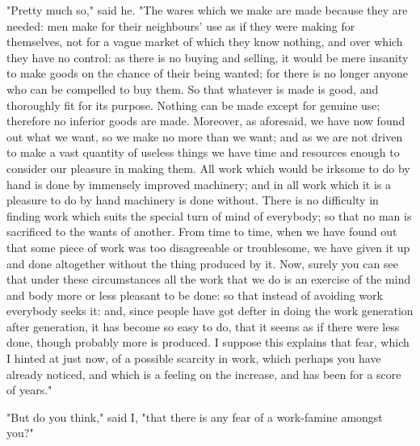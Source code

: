 "Pretty much so," said he. "The wares which we make are made because
they are needed: men make for their neighbours' use as if they were
making for themselves, not for a vague market of which they know
nothing, and over which they have no control: as there is no buying and
selling, it would be mere insanity to make goods on the chance of their
being wanted; for there is no longer anyone who can be compelled to buy
them. So that whatever is made is good, and thoroughly fit for its
purpose. Nothing can be made except for genuine use; therefore no
inferior goods are made. Moreover, as aforesaid, we have now found out
what we want, so we make no more than we want; and as we are not driven
to make a vast quantity of useless things we have time and resources
enough to consider our pleasure in making them. All work which would be
irksome to do by hand is done by immensely improved machinery; and in
all work which it is a pleasure to do by hand machinery is done without.
There is no difficulty in finding work which suits the special turn of
mind of everybody; so that no man is sacrificed to the wants of another.
From time to time, when we have found out that some piece of work was
too disagreeable or troublesome, we have given it up and done altogether
without the thing produced by it. Now, surely you can see that under
these circumstances all the work that we do is an exercise of the mind
and body more or less pleasant to be done: so that instead of avoiding
work everybody seeks it: and, since people have got defter in doing the
work generation after generation, it has become so easy to do, that it
seems as if there were less done, though probably more is produced. I
suppose this explains that fear, which I hinted at just now, of a
possible scarcity in work, which perhaps you have already noticed, and
which is a feeling on the increase, and has been for a score of years."

"But do you think," said I, "that there is any fear of a work-famine
amongst you?"

